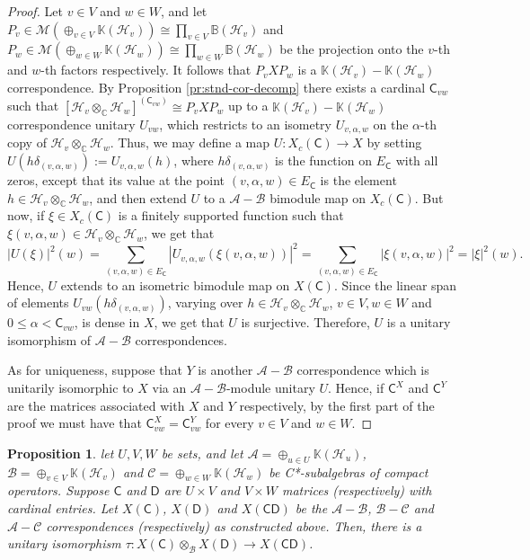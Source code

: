 \documentclass[11pt, letterpaper,final]{amsart}
\newcommand{\A}{{\mathcal{A}}}
\newcommand{\B}{{\mathcal{B}}}
\newcommand{\C}{{\mathcal{C}}}
\renewcommand{\H}{{\mathcal{H}}}
\newcommand{\M}{{\mathcal{M}}}
\newcommand{\bbB}{{\mathbb{B}}}
\newcommand{\bbK}{{\mathbb{K}}}
\newtheorem{prp}[thm]{Proposition}
\theoremstyle{definition}
\begin{document}
\begin{proof}
Let $v\in V$ and $w\in W$, and let $P_v \in \M(\oplus_{v\in V} \bbK(\H_v)) \cong \prod_{v\in V} \bbB(\H_v)$ and $P_w \in \M(\oplus_{w\in W} \bbK(\H_w)) \cong \prod_{w\in W} \bbB(\H_w)$ be the projection onto the $v$-th and $w$-th factors respectively. It follows that $P_vX P_w$ is a $\bbK(\H_v)-\bbK(\H_w)$ correspondence. By Proposition \ref{pr:stnd-cor-decomp} there exists a cardinal $\mathsf{C}_{vw}$ such that $[\H_v \otimes_\mathbb{C} \H_w]^{(\mathsf{C}_{vw})} \cong P_vX P_w$ up to a $\bbK(\H_v)-\bbK(\H_w)$ correspondence unitary $U_{vw}$, which restricts to an isometry $U_{v,\alpha, w}$ on the $\alpha$-th copy of $\H_v \otimes_\mathbb{C} \H_w$. Thus, we may define a map $U : X_c(\mathsf{C}) \rightarrow X$ by setting $U(h \delta_{(v,\alpha, w)}) := U_{v,\alpha, w}(h)$, where $h \delta_{(v,\alpha, w)}$ is the function on $E_\mathsf{C}$ with all zeros, except that its value at the point $(v,\alpha, w) \in E_\mathsf{C}$ is the element $h \in \H_v \otimes_\mathbb{C} \H_w$, and then extend $U$ to a $\A-\B$ bimodule map on $X_c(\mathsf{C})$. But now, if $\xi \in X_c(\mathsf{C})$ is a finitely supported function such that $\xi(v,\alpha, w) \in \H_v\otimes_\mathbb{C} \H_w$, we get that
$$
|U(\xi)|^2(w)= \sum_{(v,\alpha, w) \in E_\mathsf{C}} |U_{v,\alpha, w}(\xi(v,\alpha, w))|^2 = \sum_{(v,\alpha, w) \in E_\mathsf{C}} |\xi(v,\alpha, w)|^2 = |\xi|^2(w).
$$
Hence, $U$ extends to an isometric bimodule map on $X(\mathsf{C})$. Since the linear span of elements $U_{vw}(h \delta_{(v,\alpha, w)})$, varying over $h\in \H_v \otimes_\mathbb{C} \H_w$, $v\in V, w\in W$ and $0 \leq \alpha < \mathsf{C}_{vw}$, is dense in $X$, we get that $U$ is surjective. Therefore, $U$ is a unitary isomorphism of $\A-\B$ correspondences.

As for uniqueness, suppose that $Y$ is another $\A-\B$ correspondence which is unitarily isomorphic to $X$ via an $\A-\B$-module unitary $U$. Hence, if $\mathsf{C}^X$ and $\mathsf{C}^Y$ are the matrices associated with $X$ and $Y$ respectively, by the first part of the proof we must have that $\mathsf{C}^X_{vw} = \mathsf{C}^Y_{vw}$ for every $v\in V$ and $w\in W$.
\end{proof}

\begin{prp} \label{pr:mult-to-tensor}
let $U,V,W$ be sets, and let $\A = \oplus_{u\in U} \bbK(\H_u)$, $\B = \oplus_{v\in V} \bbK(\H_v)$ and $\C= \oplus_{w\in W} \bbK(\H_w)$ be C*-subalgebras of compact operators. Suppose $\mathsf{C}$ and $\mathsf{D}$ are $U\times V$ and $V\times W$ matrices (respectively) with cardinal entries. Let $X(\mathsf{C})$, $X(\mathsf{D})$ and $X(\mathsf{C}\mathsf{D})$ be the $\A-\B$, $\B-\C$ and $\A-\C$ correspondences (respectively) as constructed above. Then, there is a unitary isomorphism $\tau: X(\mathsf{C})\otimes_{\B} X(\mathsf{D}) \rightarrow X(\mathsf{C}\mathsf{D})$.
\end{prp}
\end{document}

